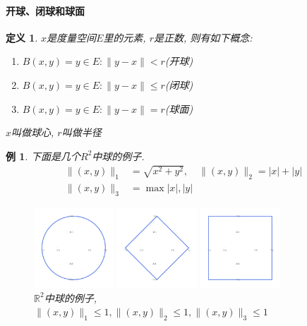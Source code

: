 \documentclass[a4paper,11pt]{article}
\newtheorem{definition}{\hspace{2em}定义}[section]
\newtheorem{example}{例}[section]
\begin{document}
\paragraph*{开球、闭球和球面}
\begin{definition}
  $x$是度量空间$E$里的元素, $r$是正数, 则有如下概念:
  \begin{enumerate}
    \item $B(x,y)={y\in E:\|y-x\|<r}$(开球)
    \item $B(x,y)={y\in E:\|y-x\|\leq r}$(闭球)
    \item $B(x,y)={y\in E:\|y-x\|=r}$(球面)
  \end{enumerate}
  $x$叫做球心, $r$叫做半径
\end{definition}
\begin{example}
  下面是几个$R^2$中球的例子.
  \begin{equation*}
    \begin{split}
       \|(x,y)\|_1 & =\sqrt{x^2+y^2},\quad\|(x,y)\|_2=|x|+|y| \\
       \|(x,y)\|_3 & =\max{|x|,|y|}
    \end{split}
  \end{equation*}
\begin{figure}[H]
  \centering
  \begin{minipage}{3cm}
    \includegraphics[width=3cm]{fig1.pdf}
  \end{minipage}
  \begin{minipage}{3cm}
    \includegraphics[width=3cm]{fig2.pdf}
  \end{minipage}
  \begin{minipage}{3cm}
    \includegraphics[width=3cm]{fig3.pdf}
  \end{minipage}
  \caption{$\mathbb{R}^2$中球的例子, $\|(x,y)\|_1\leq1, \|(x,y)\|_2\leq1, \|(x,y)\|_3\leq1$}
\end{figure}
\end{example}
\end{document}
